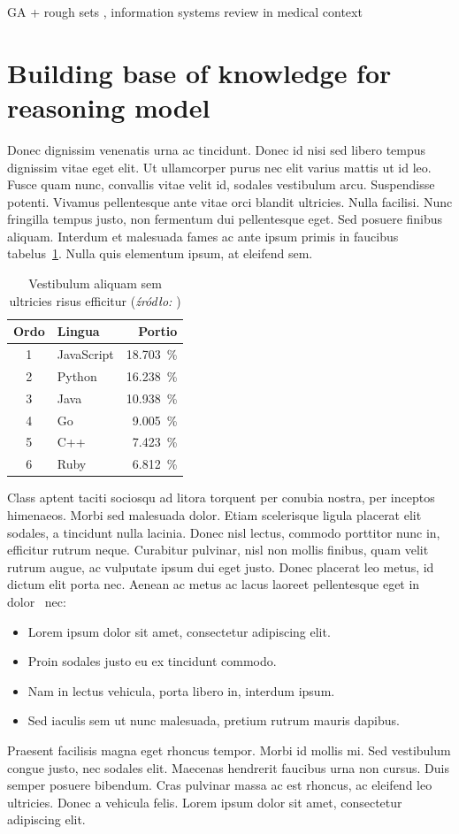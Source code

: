 \documentclass[english,masters]{wizthesis}
\begin{document}
GA + rough sets \cite{MCKEE}, information systems review in medical context \cite{hassanien}

\section{Building base of knowledge for reasoning model}
Donec dignissim venenatis urna ac tincidunt. Donec id nisi sed libero tempus
dignissim vitae eget elit. Ut ullamcorper purus nec elit varius mattis ut id
leo. Fusce quam nunc, convallis vitae velit id, sodales vestibulum arcu.
Suspendisse potenti. Vivamus pellentesque ante vitae orci blandit ultricies.
Nulla facilisi. Nunc fringilla tempus justo, non fermentum dui pellentesque
eget. Sed posuere finibus aliquam. Interdum et malesuada fames ac ante ipsum
primis in faucibus tabelus~\ref{tab:jezyki}. Nulla quis elementum ipsum, at
eleifend sem.
\begin{table}[ht]
  \centering
  \caption{Vestibulum aliquam sem ultricies risus efficitur
  (\textit{źródło: \cite{latexcompanion}})}
  \label{tab:jezyki}
  \begin{tabular}{@{}clr@{}}
    \toprule
    Ordo & Lingua     & Portio                \\ \midrule
    1    & JavaScript & \SI{18.703}{\percent} \\
    2    & Python     & \SI{16.238}{\percent} \\
    3    & Java       & \SI{10.938}{\percent} \\
    4    & Go         & \SI{9.005}{\percent}  \\
    5    & C++        & \SI{7.423}{\percent}  \\
    6    & Ruby       & \SI{6.812}{\percent}  \\ \bottomrule
  \end{tabular}
\end{table}
Class aptent taciti sociosqu ad litora torquent per conubia nostra, per inceptos
himenaeos. Morbi sed malesuada dolor. Etiam scelerisque ligula placerat elit
sodales, a tincidunt nulla lacinia. Donec nisl lectus, commodo porttitor nunc
in, efficitur rutrum neque. Curabitur pulvinar, nisl non mollis finibus, quam
velit rutrum augue, ac vulputate ipsum dui eget justo. Donec placerat leo metus,
id dictum elit porta nec. Aenean ac metus ac lacus laoreet pellentesque eget in
dolor~\cite[chap. 2]{latexcompanion} nec:
\begin{itemize}[noitemsep]
  \item Lorem ipsum dolor sit amet, consectetur adipiscing elit.
  \item Proin sodales justo eu ex tincidunt commodo.
  \item Nam in lectus vehicula, porta libero in, interdum ipsum.
  \item Sed iaculis sem ut nunc malesuada, pretium rutrum mauris dapibus.
\end{itemize}
Praesent facilisis magna eget rhoncus tempor. Morbi id mollis mi. Sed vestibulum
congue justo, nec sodales elit. Maecenas hendrerit faucibus urna non cursus.
Duis semper posuere bibendum. Cras pulvinar massa ac est rhoncus, ac eleifend
leo ultricies. Donec a vehicula felis. Lorem ipsum dolor sit amet, consectetur
adipiscing elit.
\end{document}
